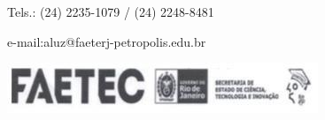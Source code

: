 \documentclass[a4paper]{report} %
\begin{document}
\begin{center}

Tels.: (24) 2235-1079 / (24) 2248-8481 


e-mail:aluz@faeterj-petropolis.edu.br

% 
\vspace*{0.3cm}
%

\includegraphics[scale=0.6]{images/rodape}

\end{center}


\end{document}
